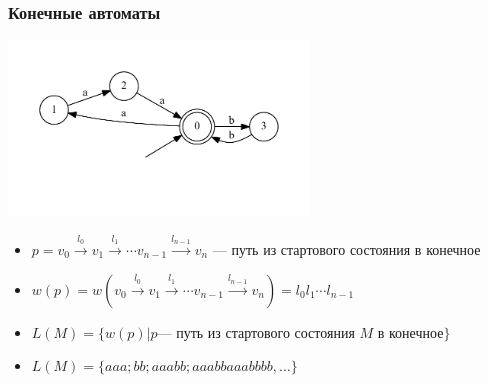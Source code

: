 \documentclass[xcolor=table,aspectratio=169]{beamer}
\begin{document}
\begin{frame}[fragile]
  \transwipe[direction=90]
  \frametitle{Конечные автоматы}
\begin{center}
        \includegraphics[width=0.6\textwidth]{pictures/atm.pdf} 
\end{center}
  \begin{itemize}
  \item $p = v_0 \xrightarrow{l_0} v_1 \xrightarrow{l_1} \cdots v_{n-1}\xrightarrow{l_{n-1}}v_n$ --- путь из стартового состояния в конечное
  \item $w(p) = w(v_0 \xrightarrow{l_0} v_1 \xrightarrow{l_1} \cdots v_{n-1}\xrightarrow{l_{n-1}}v_n) = l_0 l_1 \cdots l_{n-1}$
  \item $L(M) = \{w(p) | p  \text{--- путь из стартового состояния $M$ в конечное}\}$
  \item $L(M) = \{aaa; bb; aaabb; aaabbaaabbbb, \dots\}$
  \end{itemize}

\end{frame}
\end{document}
